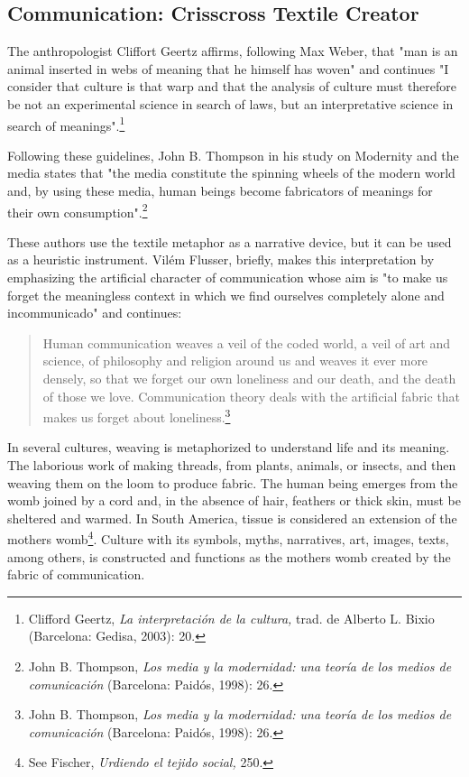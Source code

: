 \documentclass{tufte-handout}
\begin{document}
\hypertarget{communication-crisscross-textile-creator}{%
\subsection{Communication: Crisscross Textile
Creator}\label{communication-crisscross-textile-creator}}

The anthropologist Cliffort Geertz affirms, following Max Weber, that
"man is an animal inserted in webs of meaning that he himself has woven"
and continues "I consider that culture is that warp and that the
analysis of culture must therefore be not an experimental science in
search of laws, but an interpretative science in search of
meanings".\footnote{Clifford Geertz, \emph{La interpretación de la
  cultura,} trad. de Alberto L. Bixio (Barcelona: Gedisa, 2003): 20.}

Following these guidelines, John B. Thompson in his study on Modernity
and the media states that "the media constitute the spinning wheels of
the modern world and, by using these media, human beings become
fabricators of meanings for their own consumption".\footnote{John B.
  Thompson, \emph{Los media y la modernidad: una teoría de los medios de
  comunicación} (Barcelona: Paidós, 1998): 26.}

These authors use the textile metaphor as a narrative device, but it can
be used as a heuristic instrument. Vilém Flusser, briefly, makes this
interpretation by emphasizing the artificial character of communication
whose aim is "to make us forget the meaningless context in which we find
ourselves completely alone and incommunicado" and continues:

\begin{quote}
Human communication weaves a veil of the coded world, a veil of art and
science, of philosophy and religion around us and weaves it ever more
densely, so that we forget our own loneliness and our death, and the
death of those we love. Communication theory deals with the artificial
fabric that makes us forget about loneliness.\footnote{John B. Thompson,
  \emph{Los media y la modernidad: una teoría de los medios de
  comunicación} (Barcelona: Paidós, 1998): 26.}
\end{quote}

In several cultures, weaving is metaphorized to understand life and its
meaning. The laborious work of making threads, from plants, animals, or
insects, and then weaving them on the loom to produce fabric. The human
being emerges from the womb joined by a cord and, in the absence of
hair, feathers or thick skin, must be sheltered and warmed. In South
America, tissue is considered an extension of the
mother\textquotesingle s womb\footnote{See Fischer, \emph{Urdiendo el
  tejido social,} 250.}. Culture with its symbols, myths, narratives,
art, images, texts, among others, is constructed and functions as the
mother\textquotesingle s womb created by the fabric of communication.
\end{document}
